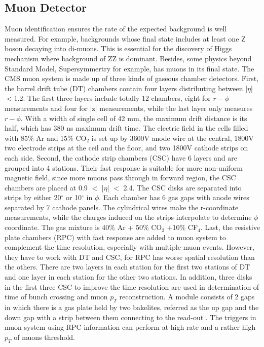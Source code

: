 \subsection{Muon Detector} 
Muon identification ensures the rate of the expected background is well measured. 
For example, backgrounds whose final state includes at least one Z boson decaying into di-muons. 
This is essential for the discovery of Higgs mechanism where background of ZZ is dominant.
Besides, some physics beyond Standard Model, Supersymmertry for example, has muons in its final state.
The CMS muon system is made up of three kinds of gaseous chamber detectors. 
First, the barrel drift tube (DT) chambers contain four layers distributing between |$\eta $| $<$1.2.
The first three layers include totally 12 chambers, eight for $r-\phi$ measurements and four for |z| measurements, while the last layer only measures $r-\phi$. 
With a width of single cell of 42 mm, the maximum drift distance is its half, which has 380 ns maximum drift time. 
The electric field in the cells filled with 85$\% $ Ar and 15$\% $ CO$_2$ is set up by 3600V anode wire at the central, 1800V two electrode strips at the ceil and the floor, and two  1800V cathode strips on each side. 
Second, the cathode strip chambers (CSC) have 6 layers and are grouped into 4 stations.
Their fast response is suitable for more non-uniform magnetic field, since more muons pass through in forward region, the CSC chambers are placed at 0.9 $<$ |$\eta $| $<$ 2.4.
The CSC disks are separated into strips by either 20$^{\circ} $ or 10$^{\circ} $ in $\phi $. 
Each chamber has 6 gas gaps with anode wires separated by 7 cathode panels. 
The cylindrical wires make the r-coordinate measurements, while the charges induced on the strips interpolate to determine $\phi $ coordinate.
The gas mixture is 40$\% $ Ar + 50$\% $ CO$_2$ +10$\% $ CF$_4$. 
Last, the resistive plate chambers (RPC) with fast response are added to muon system to complement the time resolution, especially with multiple-muon events.
However, they have to work with DT and CSC, for RPC has worse spatial resolution than the others.
There are two layers in each station for the first two stations of DT and one layer in each station for the other two stations. 
In addition, three disks in the first three CSC to improve the time resolution are used in determination of time of bunch crossing and muon $p_T$ reconstruction.
A module consists of 2 gaps in which there is a gas plate held by two bakelites, referred as the up gap and the down gap with a strip between them connecting to the read-out .
The triggers in muon system using RPC information can perform at high rate and a rather high $p_{T}$ of muons threshold.

